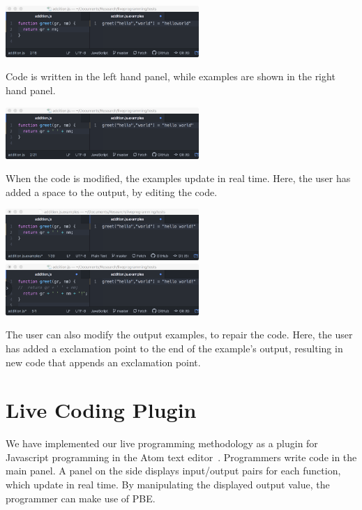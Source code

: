 \begin{marginfigure}
	\setlength{\abovecaptionskip}{0.1pt plus 0.1pt minus 0.1pt}
	\includegraphics[width=0.55\textwidth]{figures/initial_greet}
	\caption{Code is written in the left hand panel,
	while examples are shown in the right hand panel.}
\end{marginfigure}
\begin{marginfigure}
	\setlength{\abovecaptionskip}{0.1pt plus 0.1pt minus 0.1pt}
	\includegraphics[width=0.55\textwidth]{figures/manual_change}
	\caption{When the code is modified, the examples update in real time.
	Here, the user has added a space to the output, by editing the code.}
\end{marginfigure}
\begin{marginfigure}
	\setlength{\abovecaptionskip}{0.1pt plus 0.1pt minus 0.1pt}
	\includegraphics[width=0.55\textwidth]{figures/pbe_before}
	\includegraphics[width=0.55\textwidth]{figures/pbe_after}
	\caption{The user can also modify the output examples, to repair the code.  Here, the
	user has added a exclamation point to the end of the example's output, resulting in new code that appends an exclamation point.}
\end{marginfigure}

\section{Live Coding Plugin}
We have implemented our live programming methodology as a plugin
for Javascript programming in the Atom text editor~\cite{Atom}.
Programmers write code in the main panel.
A panel on the side displays input/output pairs for each function,
which update in real time.
By manipulating the displayed output value,
the programmer can make use of PBE.

